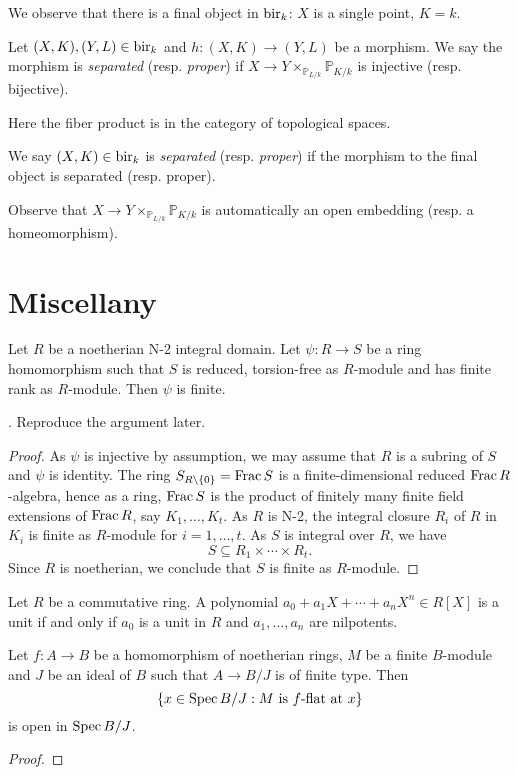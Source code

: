 We observe that there is a final object in $\mathrm{bir}_k$: $X$ is a single point, $K=k$. 

\begin{definition}
    Let $(X,K),(Y,L)\in \mathrm{bir}_k$ and $h:(X,K)\rightarrow(Y,L)$ be a morphism. We say the morphism is \emph{separated} (resp. \emph{proper}) if $X\rightarrow Y\times_{\mathbb{P}_{L/k}}\mathbb{P}_{K/k}$ is injective (resp. bijective).

    Here the fiber product is in the category of topological spaces.

    We say $(X,K)\in \mathrm{bir}_k$ is \emph{separated} (resp. \emph{proper}) if the morphism to the final object is separated (resp. proper).
\end{definition}
Observe that $X\rightarrow Y\times_{\mathbb{P}_{L/k}}\mathbb{P}_{K/k}$ is automatically an open embedding (resp. a homeomorphism).



\section{Miscellany}

\begin{proposition}\label{prop-noethjapfinite}
    Let $R$ be a noetherian N-2 integral domain. Let $\psi:R\rightarrow S$ be a ring homomorphism such that $S$ is reduced, torsion-free as $R$-module and has finite rank as $R$-module. Then $\psi$ is finite.
\end{proposition}
\cite[Page~122]{BGR}. Reproduce the argument later.
\begin{proof}
    As $\psi$ is injective by assumption, we may assume that $R$ is a subring of $S$ and $\psi$ is identity. The ring $S_{R\setminus\{0\}}=\operatorname{Frac} S$ is a finite-dimensional reduced $\operatorname{Frac} R$-algebra, hence as a ring, $\operatorname{Frac} S$ is the product of finitely many finite field extensions of $\operatorname{Frac} R$, say $K_1,\ldots,K_t$.  As $R$ is N-2, the integral closure $R_i$ of $R$ in $K_i$ is finite as $R$-module for $i=1,\ldots,t$. As $S$ is integral over $R$, we have
    \[
        S\subseteq R_1\times \cdots \times R_t.  
    \]
    Since $R$ is noetherian, we conclude that $S$ is finite as $R$-module.
\end{proof}

\begin{lemma}
    Let $R$ be a commutative ring. A polynomial $a_0+a_1X+\cdots+a_nX^n\in R[X]$ is a unit if and only if $a_0$ is a unit in $R$ and $a_1,\ldots,a_n$ are nilpotents.
\end{lemma}


\begin{lemma}\label{lma-flatlocusopenalge}
    Let $f:A\rightarrow B$ be a homomorphism of noetherian rings, $M$ be a finite $B$-module and $J$ be an ideal of $B$ such that $A\rightarrow B/J$ is of finite type. Then
    \[  
        \left\{ x\in \operatorname{Spec} B/J: M\text{ is }f\text{-flat at }x \right\}
    \]
    is open in $\operatorname{Spec} B/J$.
\end{lemma}
\begin{proof}
    
\end{proof}

\printbibliography
